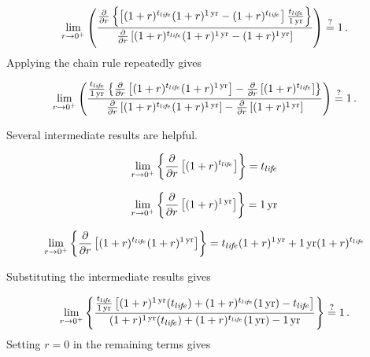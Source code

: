 \begin{equation}
  \lim_{r \to 0^+} \left(
  \frac{\frac{\partial}{\partial r} \left\{ \left[(1 + r)^{\tlife} (1 + r)^{\oneyr} - (1 + r)^{\tlife} \right] \frac{\tlife}{\oneyr} \right\}}
  {\frac{\partial}{\partial r} \left[ (1 + r)^{\tlife} (1 + r)^{\oneyr} - (1 + r)^{\oneyr}\right]}
  \right) \questionequal 1 \, .
\end{equation}
%
Applying the chain rule repeatedly gives

\begin{equation}
  \lim_{r \to 0^+} \left(
  \frac{\frac{\tlife}{\oneyr} 
      \left\{ \frac{\partial}{\partial r} \left[  (1 + r)^{\tlife} (1 + r)^{\oneyr} \right]  - 
              \frac{\partial}{\partial r} \left[  (1 + r)^{\tlife} \right] 
      \right\}}
  {\frac{\partial}{\partial r} \left[    (1 + r)^{\tlife} (1 + r)^{\oneyr} \right]  - 
              \frac{\partial}{\partial r} \left[  (1 + r)^{\oneyr} \right] }
  \right) \questionequal 1 \, .
\end{equation}

Several intermediate results are helpful.

\begin{equation}
  \lim_{r \to 0^+} \left\{\frac{\partial}{\partial r} \left[ (1 + r)^{t_{li\!f\!e}} \right] \right\} = t_{li\!f\!e}
\end{equation}

\begin{equation}
  \lim_{r \to 0^+} \left\{\frac{\partial}{\partial r} \left[ (1 + r)^{1\,\mathrm{yr}} \right] \right\} = 1\,\mathrm{yr}
\end{equation}

\begin{equation}
  \lim_{r \to 0^+} \left\{\frac{\partial}{\partial r} \left[ (1 + r)^{t_{li\!f\!e}} (1 + r)^{1\,\mathrm{yr}} \right] \right\} = t_{li\!f\!e} (1 + r)^{1\,\mathrm{yr}}  + 1\,\mathrm{yr} (1 + r)^{t_{li\!f\!e}} 
\end{equation}

Substituting the intermediate results gives

\begin{equation}
  \lim_{r \to 0^+} \left\{
                         \frac{\frac{\tlife}{\oneyr}
                         \left[ (1 + r)^{\oneyr} (\tlife) + 
                         (1 + r)^{\tlife} (\oneyr) - 
                         \tlife \right]}
                        {(1 + r)^{\oneyr} (\tlife) + 
                         (1 + r)^{\tlife} (\oneyr) - 
                         \oneyr}
                    \right\} \questionequal 1 \, .
\end{equation}
%
Setting $r = 0$ in the remaining terms gives

